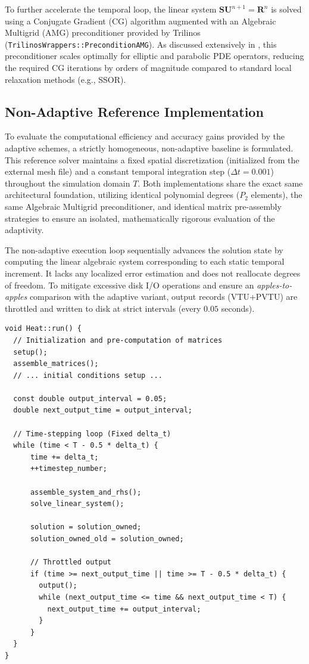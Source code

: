 \documentclass[
  11pt,
]{article}
\begin{document}
To further accelerate the temporal loop, the linear system $\mathbf{S} \mathbf{U}^{n+1} = \mathbf{R}^n$ is solved using a Conjugate Gradient (CG) algorithm augmented with an Algebraic Multigrid (AMG) preconditioner provided by Trilinos (\texttt{TrilinosWrappers::PreconditionAMG}). As discussed extensively in \cite{quarteroni_numerical_models}, this preconditioner scales optimally for elliptic and parabolic PDE operators, reducing the required CG iterations by orders of magnitude compared to standard local relaxation methods (e.g., SSOR).

\subsection{Non-Adaptive Reference Implementation}

To evaluate the computational efficiency and accuracy gains provided by the adaptive schemes, a strictly homogeneous, non-adaptive baseline is formulated. This reference solver maintains a fixed spatial discretization (initialized from the external mesh file) and a constant temporal integration step ($\Delta t = 0.001$) throughout the simulation domain $T$. Both implementations share the exact same architectural foundation, utilizing identical polynomial degrees ($P_2$ elements), the same Algebraic Multigrid preconditioner, and identical matrix pre-assembly strategies to ensure an isolated, mathematically rigorous evaluation of the adaptivity.

The non-adaptive execution loop sequentially advances the solution state by computing the linear algebraic system corresponding to each static temporal increment. It lacks any localized error estimation and does not reallocate degrees of freedom. To mitigate excessive disk I/O operations and ensure an \textit{apples-to-apples} comparison with the adaptive variant, output records (VTU+PVTU) are throttled and written to disk at strict intervals (every $0.05$ seconds).

\begin{verbatim}
void Heat::run() {
  // Initialization and pre-computation of matrices
  setup();
  assemble_matrices();
  // ... initial conditions setup ...

  const double output_interval = 0.05; 
  double next_output_time = output_interval;

  // Time-stepping loop (Fixed delta_t)
  while (time < T - 0.5 * delta_t) {
      time += delta_t;
      ++timestep_number;

      assemble_system_and_rhs();
      solve_linear_system();

      solution = solution_owned;
      solution_owned_old = solution_owned; 

      // Throttled output
      if (time >= next_output_time || time >= T - 0.5 * delta_t) {
        output();
        while (next_output_time <= time && next_output_time < T) {
          next_output_time += output_interval;
        }
      }
  }
}
\end{verbatim}
\end{document}
